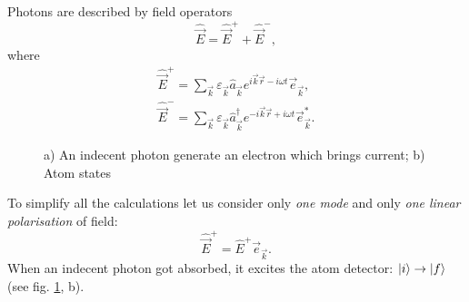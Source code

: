Photons are described by field operators
\begin{equation}
	\hat{\vec{E}} = \hat{\vec{E}}^+ + \hat{\vec{E}}^-,
\end{equation}
where
\begin{eqnarray}
	\hat{\vec{E}}^+ = \sum_{\vec{k}} \varepsilon_{\vec{k}} \hat{a}_{\vec{k}} e^{i \vec{k} \vec{r} - i \omega t} \vec{e}_{\vec{k}}, \\
	\hat{\vec{E}}^- = \sum_{\vec{k}} \varepsilon_{\vec{k}} \hat{a}^{\dagger}_{\vec{k}} e^{-i \vec{k} \vec{r} + i \omega t} \vec{e}^*_{\vec{k}}.
\end{eqnarray}

\begin{figure}[h!]
	\begin{minipage}[h]{0.49\linewidth}
	\end{minipage}
	\hfill
	\begin{minipage}[h]{0.49\linewidth}
	\end{minipage}
	\caption{a) An indecent photon generate an electron which brings current; b) Atom states}
	\label{fig:dec}
\end{figure}


To simplify all the calculations let us consider only \textit{one mode} and only \textit{one linear polarisation} of field:
\begin{equation}
	\hat{\vec{E}}^+ = \hat{E}^+ \vec{e}_{\vec{k}}.
\end{equation}
When an indecent photon got absorbed, it excites the atom detector: $\left\lvert {i} \right\rangle \to \left\lvert {f} \right\rangle$ (see fig. \ref{fig:dec}, b).


